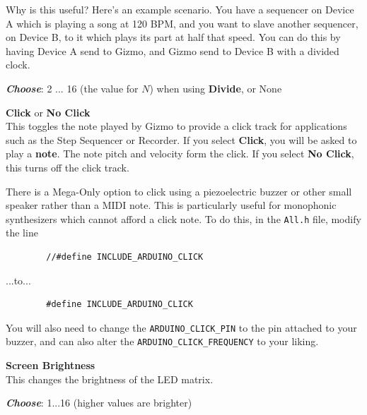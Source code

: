 \documentclass{article}
\begin{document}
\begin{description}
Why is this useful?  Here's an example scenario.  You have a sequencer on Device A which is playing a song at 120 BPM, and you want to slave another sequencer, on Device B, to it which plays its part at half that speed.  You can do this by having Device A send to Gizmo, and Gizmo send to Device B with a divided clock.

			\begin{description}
					\item{\bf \textit{Choose}}: 2 ... 16 (the value for \(N\)) when using {\bf Divide}, or None\hspace{1.45in}
			\end{description}

		
	\item{\bf Click} or {\bf No Click}\\
		This toggles the note played by Gizmo to provide a click track for applications such as the Step Sequencer or Recorder.  If you select {\bf Click}, you will be asked to play a {\bf note}.  The note pitch and velocity form the click.  If you select {\bf No Click}, this turns off the click track.
		
		There is a Mega-Only option to click using a piezoelectric buzzer or other small speaker rather than a MIDI note.  This is particularly useful for monophonic synthesizers which cannot afford a click note.  To do this, in the \texttt{All.h} file, modify the line 
\begin{verbatim}
        //#define INCLUDE_ARDUINO_CLICK
\end{verbatim}
...to...
\begin{verbatim}
        #define INCLUDE_ARDUINO_CLICK
\end{verbatim}

You will also need to change the {\tt ARDUINO\_CLICK\_PIN} to the pin attached to your buzzer, and can also alter the {\tt ARDUINO\_CLICK\_FREQUENCY} to your liking.

		
\hspace{\fill}\vspace{-1.5em}

	\item{\bf Screen Brightness}\\
		This changes the brightness of the LED matrix.
		\begin{description}
		\item{\bf \textit{Choose}}: 1...16 (higher values are brighter)
		\end{description}
		

\end{description}
\end{document}
